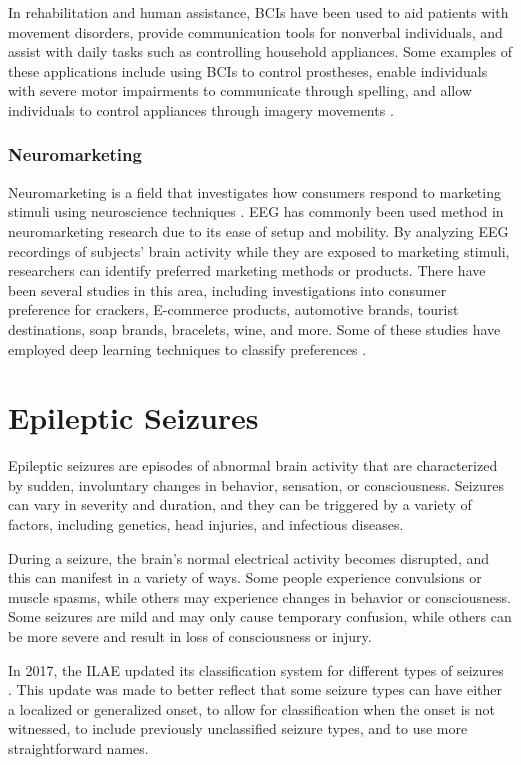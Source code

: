 In rehabilitation and human assistance, \glspl{BCI} have been used to aid patients with movement disorders, provide communication tools for nonverbal individuals, and assist with daily tasks such as controlling household appliances. Some examples of these applications include using \glspl{BCI} to control prostheses, enable individuals with severe motor impairments to communicate through spelling, and allow individuals to control appliances through imagery movements \cite{robinson_adaptive_2015}.

\subsubsection{ Neuromarketing }
Neuromarketing is a field that investigates how consumers respond to marketing stimuli using neuroscience techniques \cite{lai_literature_2018}. 
\gls{EEG} has commonly been used method in neuromarketing research due to its ease of setup and mobility. By analyzing \gls{EEG} recordings of subjects' brain activity while they are exposed to marketing stimuli, researchers can identify preferred marketing methods or products. There have been several studies in this area, including investigations into consumer preference for crackers, E-commerce products, automotive brands, tourist destinations, soap brands, bracelets, wine, and more. Some of these studies have employed deep learning techniques to classify preferences \cite{bazzani_is_2020, khurana_survey_2021}.


\section{Epileptic Seizures}
Epileptic seizures are episodes of abnormal brain activity that are characterized by sudden, involuntary changes in behavior, sensation, or consciousness. Seizures can vary in severity and duration, and they can be triggered by a variety of factors, including genetics, head injuries, and infectious diseases.

During a seizure, the brain's normal electrical activity becomes disrupted, and this can manifest in a variety of ways. Some people experience convulsions or muscle spasms, while others may experience changes in behavior or consciousness. Some seizures are mild and may only cause temporary confusion, while others can be more severe and result in loss of consciousness or injury.

In 2017, the \gls{ILAE} updated its classification system for different types of seizures \cite{fisher_instruction_2017, fisher_operational_2017}. This update was made to better reflect that some seizure types can have either a localized or generalized onset, to allow for classification when the onset is not witnessed, to include previously unclassified seizure types, and to use more straightforward names.

